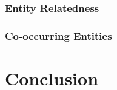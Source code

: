 \documentclass[sigconf,authordraft]{acmart}
\begin{document}
\subsubsection{Entity Relatedness}
\label{subsubsec:Entity Salience}

\subsubsection{Co-occurring Entities}
\label{subsubsec:Entity Salience}



\section{Conclusion}
\label{sec:Conclusion}



\end{document}
